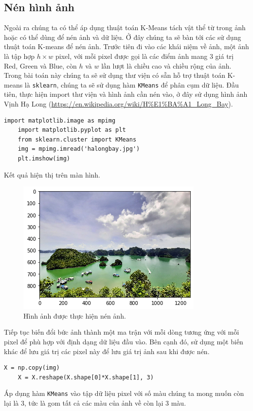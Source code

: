 \documentclass{article}
\begin{document}
	\subsection{Nén hình ảnh} %
	\label{sub:nén_hình_ảnh}
	Ngoài ra chúng ta có thể áp dụng thuật toán K-Means tách vật thể từ trong ảnh hoặc có thể dùng để nén ảnh và dữ liệu. Ở đây chúng ta sẽ bàn tới các sử dụng thuật toán K-means để nén ảnh. Trước tiên đi vào các khái niệm về ảnh, một ảnh là tập hợp $h\times w$ pixel, với mỗi pixel được gọi là các điểm ảnh mang 3 giá trị Red, Green và Blue, còn $h$ và $w$ lần lượt là chiều cao và chiều rộng của ảnh. Trong bài toán này chúng ta sẽ sử dụng thư viện có sẵn hỗ trợ thuật toán K-means là \texttt{sklearn}, chúng ta sẽ sử dụng hàm \texttt{KMeans} để phân cụm dữ liệu. Đầu tiên, thực hiện import thư viện và hình ảnh cần nén vào, ở đây sử dụng hình ảnh Vịnh Hạ Long (\url{https://en.wikipedia.org/wiki/H%E1%BA%A1_Long_Bay}).
	\begin{lstlisting}[style=myPythonStyle]
	import matplotlib.image as mpimg
	import matplotlib.pyplot as plt
	from sklearn.cluster import KMeans
	img = mpimg.imread('halongbay.jpg')
	plt.imshow(img)
	\end{lstlisting}
	Kết quả hiện thị trên màn hình.
	\begin{figure}[h]
		\centering
		\includegraphics[width=0.6\linewidth]{img/vhl}
		\caption{Hình ảnh được thực hiện nén ảnh.}
	\end{figure}
	\newpage
	Tiếp tục biến đổi bức ảnh thành một ma trận với mỗi dòng tương ứng với mỗi pixel để phù hợp với định dạng dữ liệu đầu vào. Bên cạnh đó, sử dụng một biến khác để lưu giá trị các pixel này để lưu giá trị ảnh sau khi được nén.
	\begin{lstlisting}[style=myPythonStyle]
	X = np.copy(img)
	X = X.reshape(X.shape[0]*X.shape[1], 3)
	\end{lstlisting}
	Áp dụng hàm \texttt{KMeans} vào tập dữ liệu pixel với số màu chúng ta mong muốn còn lại là 3, tức là gom tất cả các màu của ảnh về còn lại 3 màu.
\end{document}
